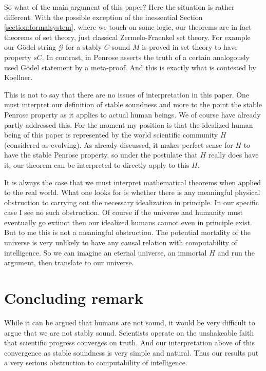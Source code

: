 \documentclass{amsart}  %
\numberwithin{equation}{section}
\theoremstyle{definition}
\theoremstyle{remark}
\begin{document}
{So what of the main argument of this paper? 
Here the situation is rather different. With the possible exception of the inessential Section \ref{section:formalsystem}, where we touch on some logic, our theorems are in fact theorems of set theory, just classical Zermelo-Fraenkel set theory. For example our G\"odel string $\mathcal{G}$ for a stably $C$-sound $M$ is proved in set theory to have property $sC$. In contrast, in  \cite{citePenroseBeyondShadow} Penrose asserts the truth of a certain analogously used G\"odel statement by a meta-proof. And this is exactly what is contested by Koellner. 

This is not to say that there are no issues of interpretation in this paper.  One must interpret our definition of stable soundness and more to the point the stable Penrose property as it applies to actual human beings.
We of course have already partly addressed this. For the moment my position is that the idealized human being of this paper is represented by the world scientific community $H$ (considered as evolving). As already discussed, it makes perfect sense for $H$ to have the stable Penrose property, so under the postulate that $H$ really does have it, our theorem can be interpreted to directly apply to this $H$.  

It is always the case that we must interpret mathematical theorems when applied to the real world. What one looks for is whether there is any meaningful physical obstruction to carrying out the necessary idealization in principle. In our specific case I see no such obstruction. 
Of course if the universe and humanity must eventually go extinct then our idealized humans cannot even in principle exist. But to me this is not a meaningful obstruction. The potential mortality of the universe is very unlikely to have any causal relation with computability of intelligence. So we can imagine an eternal universe, an immortal $H$ and run the argument, then translate to our universe.
\section{Concluding remark} While it can be argued that humans are not sound,  it would be very difficult to argue that we are not stably sound.  Scientists operate on the unshakeable faith that scientific progress converges on truth. And our interpretation above of this convergence as stable soundness is very simple and natural. Thus our results put a very serious obstruction to computability of intelligence.  

}
\end{document}
